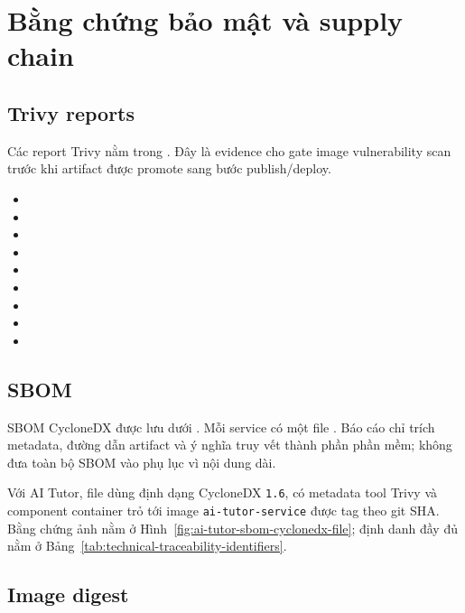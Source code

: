 \chapter{Bằng chứng bảo mật và supply chain}
\label{appendix:security-reports}

\section{Trivy reports}

Các report Trivy nằm trong . Đây là evidence cho gate image vulnerability scan trước khi artifact được promote sang bước publish/deploy.

\begin{itemize}
  \item {}
  \item {}
  \item {}
  \item {}
  \item {}
  \item {}
  \item {}
  \item {}
  \item {}
\end{itemize}


\section{SBOM}

SBOM CycloneDX được lưu dưới . Mỗi service có một file . Báo cáo chỉ trích metadata, đường dẫn artifact và ý nghĩa truy vết thành phần phần mềm; không đưa toàn bộ SBOM vào phụ lục vì nội dung dài.

Với AI Tutor, file  dùng định dạng CycloneDX \texttt{1.6}, có metadata tool Trivy và component container trỏ tới image \texttt{ai-tutor-service} được tag theo git SHA. Bằng chứng ảnh nằm ở Hình~\ref{fig:ai-tutor-sbom-cyclonedx-file}; định danh đầy đủ nằm ở Bảng~\ref{tab:technical-traceability-identifiers}.


\section{Image digest}

